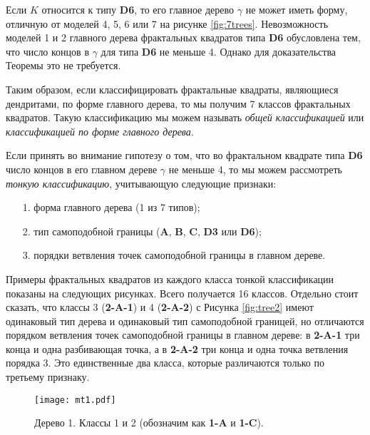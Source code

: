 \begin{remark}
Если $K$ относится к типу {\bf D6}, то его главное дерево $\gamma$ не может иметь форму, отличную от моделей 4, 5, 6 или 7 на рисунке \ref{fig:7trees}.
Невозможность моделей 1 и 2 главного дерева фрактальных квадратов типа {\bf D6} обусловлена тем, что число концов в $\gamma$ для типа {\bf D6} не меньше 4.
Однако для доказательства Теоремы \label{thm:7trees} это не требуется.
\end{remark}

Таким образом, если классифицировать фрактальные квадраты, являющиеся дендритами, по форме главного дерева, то мы получим 7 классов фрактальных квадратов.
Такую классификацию мы можем называть {\em общей классификацией} или {\em классификацией по форме главного дерева}.

Если принять во внимание гипотезу о том, что во фрактальном квадрате типа {\bf D6} число концов в его главном дереве $\gamma$ не меньше 4, то мы можем рассмотреть {\em тонкую классификацию}, учитывающую следующие признаки:
\begin{itemize}[nolistsep]
	\item[1.] форма главного дерева (1 из 7 типов);
	\item[2.] тип самоподобной границы ({\bf A}, {\bf B}, {\bf C}, {\bf D3} или {\bf D6});
	\item[3.] порядки ветвления точек самоподобной границы в главном дереве.
\end{itemize}

Примеры фрактальных квадратов из каждого класса тонкой классификации показаны на следующих рисунках.
Всего получается 16 классов.
Отдельно стоит сказать, что классы 3 ({\bf 2-A-1}) и 4 ({\bf 2-A-2}) с Рисунка \ref{fig:tree2} имеют одинаковый тип дерева и одинаковый тип самоподобной границей, но отличаются порядком ветвления точек самоподобной границы в главном дереве: в {\bf 2-A-1} три конца и одна разбивающая точка, а в {\bf 2-A-2} три конца и одна точка ветвления порядка 3.
Это единственные два класса, которые различаются только по третьему признаку.


\begin{figure}[H]
    \centering
    \texttt{[image: mt1.pdf]}
    \vspace{0.5cm}
    \vfill
    \hfill
    \caption{Дерево 1. Классы 1 и 2 (обозначим как \textbf{1-A} и \textbf{1-C}). }
    \label{fig:tree1}
\end{figure}


